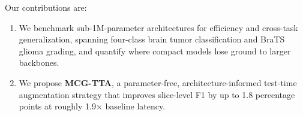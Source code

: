 Our contributions are:
\begin{enumerate}
\item We benchmark sub-1M-parameter architectures for efficiency and cross-task generalization, spanning four-class brain tumor classification and BraTS glioma grading, and quantify where compact models lose ground to larger backbones.
\item We propose \textbf{MCG-TTA}, a parameter-free, architecture-informed test-time augmentation strategy that improves slice-level F1 by up to 1.8 percentage points at roughly 1.9$\times$ baseline latency.
\end{enumerate}
